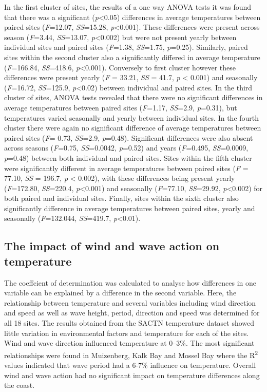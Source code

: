 \documentclass[12pt,a4paper,]{article}
\begin{document}
In the first cluster of sites, the results of a one way ANOVA tests it
was found that there was a significant (\emph{p}\textless{}0.05)
differences in average temperatures between paired sites
(\emph{F}=12.07, \emph{SS}=15.28, \emph{p}\textless{}0.001). These
differences were present across season (\emph{F}=3.44, \emph{SS}=13.07,
\emph{p}\textless{}0.002) but were not present yearly between individual
sites and paired sites (\emph{F}=1.38, \emph{SS}=1.75, \emph{p}=0.25).
Similarly, paired sites within the second cluster also a significantly
differed in average temperature (\emph{F}=166.84, \emph{SS}=418.6,
\emph{p}\textless{}0.001). Conversely to first cluster however these
differences were present yearly (\emph{F} = 33.21, \emph{SS} = 41.7,
\emph{p} \textless{} 0.001) and seasonally (\emph{F}=16.72,
\emph{SS}=125.9, \emph{p}\textless{}0.02) between individual and paired
sites. In the third cluster of sites, ANOVA tests revealed that there
were no significant differences in average temperatures between paired
sites (\emph{F}=1.17, \emph{SS}=2.9, \emph{p}=0.31), but temperatures
varied seasonally and yearly between individual sites. In the fourth
cluster there were again no significant difference of average
temperatures between paired sites (\emph{F}= 0.73, \emph{SS}=2.9,
\emph{p}=0.48). Significant differences were also absent across seasons
(\emph{F}=0.75, \emph{SS}=0.0042, \emph{p}=0.52) and years
(\emph{F}=0.495, \emph{SS}=0.0009, \emph{p}=0.48) between both
individual and paired sites. Sites within the fifth cluster were
significantly different in average temperatures between paired sites
(\emph{F} = 77.10, \emph{SS} = 196.7, \emph{p} \textless{} 0.002), with
these differences being present yearly (\emph{F}=172.80,
\emph{SS}=220.4, \emph{p}\textless{}0.001) and seasonally
(\emph{F}=77.10, \emph{SS}=29.92, \emph{p}\textless{}0.002) for both
paired and individual sites. Finally, sites within the sixth cluster
also significantly difference in average temperatures between paired
sites, yearly and seasonally (\emph{F}=132.044, \emph{SS}=419.7,
\emph{p}\textless{}0.01).

\hypertarget{the-impact-of-wind-and-wave-action-on-temperature}{%
\subsection{The impact of wind and wave action on
temperature}\label{the-impact-of-wind-and-wave-action-on-temperature}}

The coeffcient of determination was calculated to analyse how
differences in one variable can be explained by a difference in the
second variable. Here, the relationship between temperature and several
variables including wind direction and speed as well as wave height,
period, direction and speed was determined for all 18 sites. The results
obtained from the SACTN temperature dataset showed little variation in
environmental factors and temperature for each of the sites. Wind and
wave direction influenced temperature at 0--3\%. The most significant
relationships were found in Muizenberg, Kalk Bay and Mossel Bay where
the R\textsuperscript{2} values indicated that wave period had a 6-7\%
influence on temperature. Overall wind and wave action had no
significant impact on temperature differences along the coast.
\end{document}
